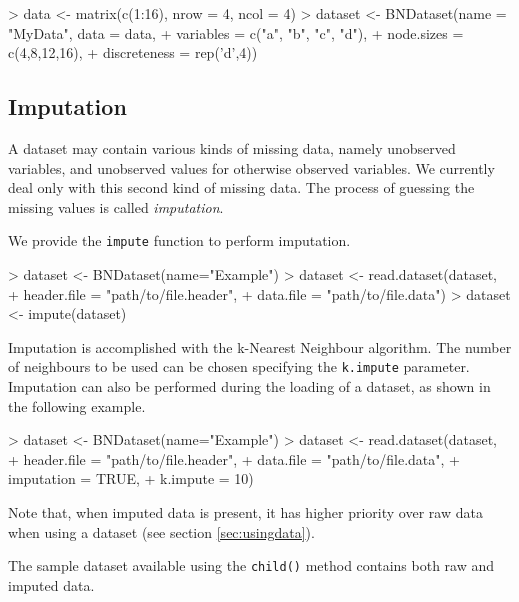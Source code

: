 \documentclass{article}
\newcommand{\Rmethod}[1]{{\texttt{#1}}}
\newcommand{\Rfunarg}[1]{{\texttt{#1}}}
\begin{document}
\begin{Schunk}
\begin{Sinput}
> data <- matrix(c(1:16), nrow = 4, ncol = 4)
> dataset <- BNDataset(name = "MyData", data = data,
+                      variables = c("a", "b", "c", "d"),
+                      node.sizes = c(4,8,12,16),
+                      discreteness = rep('d',4))
\end{Sinput}
\end{Schunk}

\subsection{Imputation}
A dataset may contain various kinds of missing data, namely unobserved variables,
and unobserved values for otherwise observed variables. We currently deal only with this
second kind of missing data. The process of guessing the missing values is called \emph{imputation}.

We provide the \Rmethod{impute} function to perform imputation.
\begin{Schunk}
\begin{Sinput}
> dataset <- BNDataset(name="Example")
> dataset <- read.dataset(dataset,
+                         header.file = "path/to/file.header",
+                         data.file   = "path/to/file.data")
> dataset <- impute(dataset)
\end{Sinput}
\end{Schunk}

Imputation is accomplished with the k-Nearest Neighbour algorithm. The number of neighbours to be used
can be chosen specifying the \Rfunarg{k.impute} parameter.
Imputation can also be performed during the loading of a dataset, as shown in the following example.
\begin{Schunk}
\begin{Sinput}
> dataset <- BNDataset(name="Example")
> dataset <- read.dataset(dataset,
+                         header.file = "path/to/file.header",
+                         data.file   = "path/to/file.data",
+                         imputation  = TRUE,
+                         k.impute    = 10)
\end{Sinput}
\end{Schunk}

Note that, when imputed data is present, it has higher priority over raw data when using a dataset
(see section \ref{sec:usingdata}).

The sample dataset available using the \Rmethod{child()} method contains both raw and imputed data.
\end{document}
